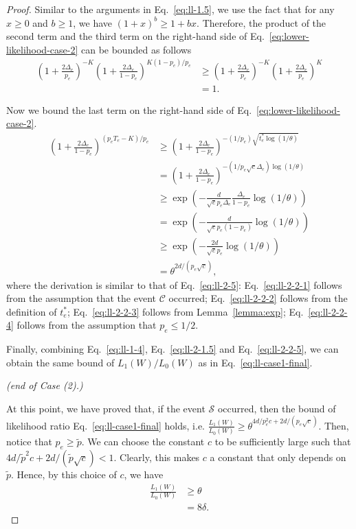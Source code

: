 \documentclass{article}
\begin{document}
\begin{spacing}{1.1}
\begin{proof}
Similar to the arguments in Eq.~\eqref{eq:ll-1.5}, we use the fact that for any $x \ge 0$ and $b \ge 1$, we have $(1+x)^b \ge 1+bx$. 
Therefore, the product of the second term and the third term on the right-hand side of Eq.~\eqref{eq:lower-likelihood-case-2} can be bounded as follows
\begin{align}
\left(1+\frac{2\Delta_e}{p_e}\right)^{-K}\left(1+\frac{2\Delta_e}{1-p_e}\right)^{K(1-p_e)/p_e} &
\ge \left(1+\frac{2\Delta_e}{p_e}\right)^{-K}\left(1+\frac{2\Delta_e}{p_e}\right)^K \nonumber \\
&= 1 \label{eq:ll-2-1.5}.
\end{align}

Now we bound the last term on the right-hand side of Eq.~\eqref{eq:lower-likelihood-case-2}.
\begin{align}
\left(1+\frac{2\Delta_e}{1-p_e}\right)^{(p_eT_e-K)/p_e} 
&\ge \left(1+\frac{2\Delta_e}{1-p_e}\right)^{-(1/p_e)\sqrt{t_e^*\log(1/\theta)}} \label{eq:ll-2-2-1} \\
&= \left(1+\frac{2\Delta_e}{1-p_e}\right)^{-(1/p_e\sqrt{c}\Delta_e)\log(1/\theta)} \label{eq:ll-2-2-2} \\
& \ge \exp\left(-\frac{d}{\sqrt c p_e \Delta_e}\frac{\Delta_e}{1-p_e}\log(1/\theta)\right) \label{eq:ll-2-2-3} \\
& = \exp\left(-\frac{d}{\sqrt c p_e (1-p_e)}\log(1/\theta)\right) \nonumber \\
& \ge \exp\left(-\frac{2d}{\sqrt c p_e}\log(1/\theta)\right) \label{eq:ll-2-2-4} \\
& = \theta^{2d/(p_e\sqrt{c})} \label{eq:ll-2-2-5},
\end{align}
where the derivation is similar to that of Eq.~\eqref{eq:ll-2-5}: 
Eq.~\eqref{eq:ll-2-2-1} follows from the assumption that the event $\mathcal C$ occurred;
Eq.~\eqref{eq:ll-2-2-2} follows from the definition of $t_e^*$;
Eq.~\eqref{eq:ll-2-2-3} follows from Lemma~\ref{lemma:exp};
Eq.~\eqref{eq:ll-2-2-4} follows from the assumption that $p_e \le 1/2$.

Finally, combining Eq.~\eqref{eq:ll-1-4}, Eq.~\eqref{eq:ll-2-1.5} and Eq.~\eqref{eq:ll-2-2-5}, we can obtain the same bound of $L_1(W)/L_0(W)$ as in Eq.~\eqref{eq:ll-case1-final}.

\emph{(end of Case (2).)}

At this point, we have proved that, if the event $\mathcal S$ occurred, then the bound of likelihood ratio Eq.~\eqref{eq:ll-case1-final} holds, i.e. $\frac{L_1(W)}{L_0(W)} \ge \theta^{4d/p_e^2c+2d/(p_e\sqrt{c})}$.
Then, notice that $p_e \ge \tilde p$. 
We can choose the constant $c$ to be sufficiently large such that $4d/\tilde p^2c+2d/(\tilde p\sqrt{c}) < 1$.
Clearly, this makes $c$ a constant that only depends on $\tilde p$.
Hence, by this choice of $c$, we have
\begin{align}
\frac{L_1(W)}{L_0(W)} &\ge \theta \nonumber \\
					  &= 8\delta.	
\end{align}



\end{proof}
\end{spacing}
\end{document}
